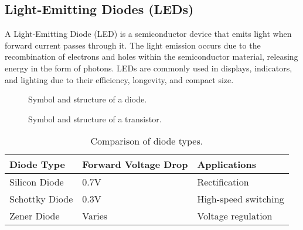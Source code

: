 \subsection*{Light-Emitting Diodes (LEDs)}
A Light-Emitting Diode (LED) is a semiconductor device that emits light when forward current passes through it. The light emission occurs due to the recombination of electrons and holes within the semiconductor material, releasing energy in the form of photons. LEDs are commonly used in displays, indicators, and lighting due to their efficiency, longevity, and compact size.

\begin{figure}[htbp]
    \centering
    \caption{Symbol and structure of a diode.}
    \label{fig:diode}
\end{figure}

\begin{figure}[htbp]
    \centering
    \caption{Symbol and structure of a transistor.}
    \label{fig:transistor}
\end{figure}

\begin{table}[htbp]
    \centering
    \caption{Comparison of diode types.}
    \label{tab:diode_types}
    \begin{tabular}{|l|l|l|}
        \hline
        \textbf{Diode Type} & \textbf{Forward Voltage Drop} & \textbf{Applications} \\ \hline
        Silicon Diode       & 0.7V                         & Rectification         \\ \hline
        Schottky Diode      & 0.3V                         & High-speed switching  \\ \hline
        Zener Diode         & Varies                       & Voltage regulation    \\ \hline
    \end{tabular}
\end{table}

